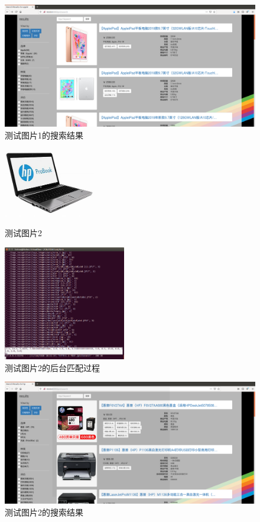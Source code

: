 \begin{figure}[htbp]
\centering
\includegraphics[width=14.5cm]{img/zlt/pictmatch1_1.png}
\caption{测试图片1的搜索结果}
\label{fig:zlt_pictmatch1}
\end{figure}
\begin{figure}[htbp]
\centering
\begin{minipage}[t]{0.48\textwidth}
\centering
\includegraphics[height=3cm]{img/zlt/test2.jpeg}
\caption{测试图片2}
\label{fig:zlt_test2}
\end{minipage}
\begin{minipage}[t]{0.48\textwidth}
\centering
\includegraphics[height=5cm]{img/zlt/pictmatch2_2.png}
\caption{测试图片2的后台匹配过程}
\label{fig:zlt_pictmatch2_2}
\end{minipage}
\end{figure} 

\begin{figure}[htbp]
\centering
\includegraphics[width=14.5cm]{img/zlt/pictmatch2_1.png}
\caption{测试图片2的搜索结果}
\label{fig:zlt_pictmatch2}
\end{figure}


